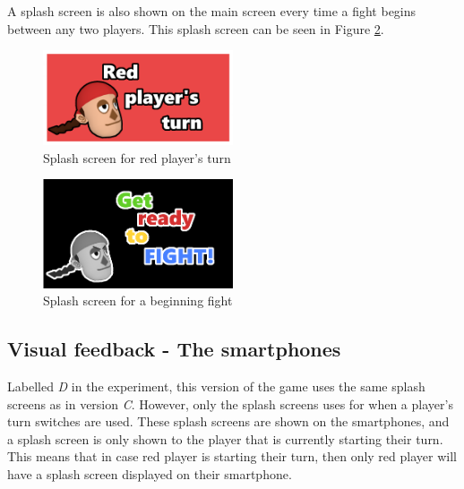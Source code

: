 A splash screen is also shown on the main screen every time a fight begins between any two players. This splash screen can be seen in Figure \ref{fig:fight_splash}.

\begin{figure}[h!]
	\centering
	\includegraphics[width=0.5\textwidth]{figures/redturn.png}
	\caption{Splash screen for red player's turn}\label{fig:redturn}
\end{figure}

\begin{figure}[h!]
	\centering
	\includegraphics[width=0.5\textwidth]{figures/getready.png}
	\caption{Splash screen for a beginning fight}\label{fig:fight_splash}
\end{figure}

\subsection{Visual feedback - The smartphones}\label{sub:visual_smartphone}
Labelled \textit{D} in the experiment, this version of the game uses the same splash screens as in version \textit{C}. However, only the splash screens uses for when a player's turn switches are used. These splash screens are shown on the smartphones, and a splash screen is only shown to the player that is currently starting their turn. This means that in case red player is starting their turn, then only red player will have a splash screen displayed on their smartphone.